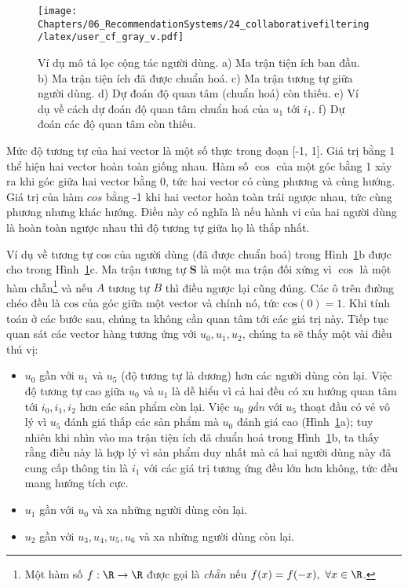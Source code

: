  \begin{figure}[t]
\centering
    \texttt{[image: Chapters/06\_RecommendationSystems/24\_collaborativefiltering/latex/user\_cf\_gray\_v.pdf]}
    \caption[]{Ví dụ mô tả lọc cộng tác người dùng. a) Ma trận tiện ích ban đầu. b) Ma trận tiện ích đã được chuẩn hoá. c) Ma trận tương tự giữa người dùng. d) Dự đoán độ quan tâm (chuẩn hoá) còn thiếu. e) Ví dụ về cách dự đoán độ quan tâm chuẩn hoá của $u_1$ tới $i_1$. f) Dự đoán các độ quan tâm còn thiếu.}
    \label{fig:24_2}
\end{figure}

Mức độ tương tự của hai vector là một số thực trong đoạn [-1, 1]. Giá
trị bằng 1 thể hiện hai vector hoàn toàn giống nhau. Hàm số
${\cos}$ của một góc bằng 1 xảy ra khi góc giữa hai vector bằng 0, tức hai
vector có cùng phương và cùng hướng. Giá trị của hàm ${cos}$ bằng -1 khi hai 
vector hoàn toàn trái ngược nhau, tức cùng phương nhưng khác hướng. Điều này có
nghĩa là nếu {hành vi} của hai người dùng là hoàn toàn
ngược nhau thì độ tương tự giữa họ là thấp nhất.
 
Ví dụ về tương tự cos của người dùng (đã được chuẩn
hoá) trong Hình~\ref{fig:24_2}b được cho trong Hình~\ref{fig:24_2}c.
Ma trận tương tự $\mathbf{S}$ là
một ma trận đối xứng vì $\cos$ là một hàm chẵn\footnote{Một hàm số
$f:\R\rightarrow \R$ được gọi là \textit{chẵn} nếu $f(x) = f(-x),~\forall x \in
\R$.} và nếu $A$ tương tự $B$ thì điều
ngược lại cũng đúng. Các ô trên đường chéo đều là
$\text{cos}$ của góc giữa một vector và chính nó, tức $\text{cos}(0) = 1$. Khi
tính toán ở các bước sau, chúng ta không cần quan tâm tới các giá trị này.
Tiếp tục quan sát các vector hàng tương ứng với $u_0, u_1, u_2$, chúng ta sẽ
thấy một vài điều thú vị:

\begin{itemize}
    \item $u_0$ {gần} với $u_1$ và $u_5$ (độ tương tự là dương) hơn các
    người dùng còn lại. Việc độ tương tự cao giữa $u_0$ và $u_1$ là
    dễ hiểu vì cả hai đều có xu hướng quan tâm tới $i_0, i_1, i_2$ hơn các
    sản phẩm còn lại. Việc $u_0$ \textit{gần} với $u_5$ thoạt đầu có vẻ vô
    lý vì $u_5$ đánh giá thấp các sản phẩm mà $u_0$ đánh giá cao
    (Hình~\ref{fig:24_2}a); tuy nhiên khi nhìn vào ma trận tiện ích đã chuẩn hoá
    trong Hình~\ref{fig:24_2}b, ta thấy rằng điều này là hợp lý vì sản phẩm duy
    nhất mà cả hai người dùng này đã cung cấp thông tin là $i_1$ với các giá
    trị tương ứng đều lớn hơn không, tức đều mang hướng tích cực.
     
    \item $u_1$ gần với $u_0$ và xa những người dùng còn lại.  
     
\item $u_2$ gần với $u_3, u_4, u_5, u_6$ và xa những người dùng còn lại.  
\end{itemize}
 
